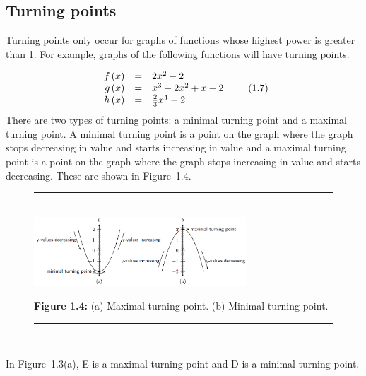 \subsection{ Turning points}
\nopagebreak
\label{m39337*id236645}Turning points only occur for graphs of functions whose highest power is greater than 1. For example, graphs of the following functions will have turning points.\par 
\label{m39337*id236652}\nopagebreak\noindent{}
\begin{equation}
\begin{array}{ccc}\hfill f\left(x\right)& =& 2{x}^{2}-2\hfill \\ \hfill g\left(x\right)& =& {x}^{3}-2{x}^{2}+x-2\hfill \\ \hfill h\left(x\right)& =& \frac{2}{3}{x}^{4}-2\hfill \end{array}\tag{1.7}
\end{equation}
\label{m39337*id236788}There are two types of turning points: a minimal turning point and a maximal turning point. A minimal turning point is a point on the graph where the graph stops decreasing in value and starts increasing in value and a maximal turning point is a point on the graph where the graph stops increasing in value and starts decreasing. These are shown in Figure~1.4.\par 
\setcounter{subfigure}{0}
\begin{figure}[H] %
\begin{center}
\rule[.1in]{\figurerulewidth}{.005in} \\
\label{m39337*uid48!!!underscore!!!media}\label{m39337*uid48!!!underscore!!!printimage}\includegraphics[width=300px]{col11306.imgs/m39337_MG10C11_035.png} %
\vspace{2pt}
\vspace{\rubberspace}\par \begin{cnxcaption}
\small \textbf{Figure 1.4: }(a) Maximal turning point. (b) Minimal turning point.
\end{cnxcaption}
\vspace{.1in}
\rule[.1in]{\figurerulewidth}{.005in} \\
\end{center}
\end{figure}       
\label{m39337*id236816}In Figure~1.3(a), E is a maximal turning point and D is a minimal turning point.\par 
\label{m39337*uid49}

